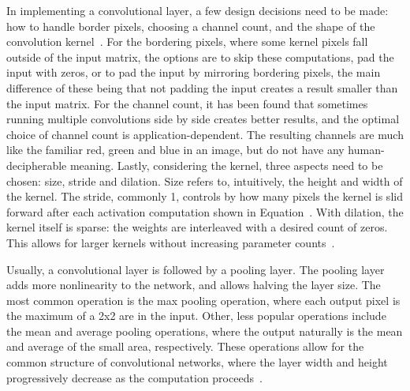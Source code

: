 \documentclass[english,twoside,openright]{UH_DS_MSc}
\begin{document}
In implementing a convolutional layer, a few design decisions need to be made: how to handle border 
pixels, choosing a channel count, and the shape of the convolution kernel~\cite{princebook}.
For the bordering pixels, where some kernel pixels fall outside of the 
input matrix, the options are to skip these computations, pad the input with zeros, or to pad the input 
by mirroring bordering pixels, the main difference of these being that not padding the input creates a 
result smaller than the input matrix. For the channel count, it has been found that sometimes 
running multiple convolutions side by side creates better results, and the optimal choice of channel count is 
application-dependent. The resulting channels are much like the familiar red, green and blue in an image, but do not 
have any human-decipherable meaning. Lastly, considering the kernel, three aspects need to be chosen: size, stride and dilation.
Size refers to, intuitively, the height and width of the kernel. The stride, commonly 1, controls by how many pixels the 
kernel is slid forward after each activation computation shown in Equation~\cite{eq:convolution}. With dilation, the kernel itself 
is sparse: the weights are interleaved with a desired count of zeros. This allows for larger kernels without increasing parameter counts~\cite{princebook}.

Usually, a convolutional layer is followed by a pooling layer. The pooling layer adds more nonlinearity to the network, 
and allows halving the layer size. The most common operation is the max pooling operation, where each output pixel is the maximum of
a 2x2 are in the input. Other, less popular operations include the mean and average pooling operations, where the output naturally 
is the mean and average of the small area, respectively. These operations allow for the common structure of convolutional networks, 
where the layer width and height progressively decrease as the computation proceeds~\cite{princebook}.
\end{document}
